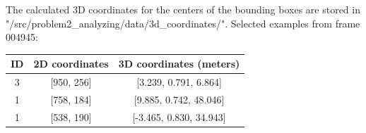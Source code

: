 \documentclass[]{article}
\begin{document}
\begin{enumerate}
		The calculated 3D coordinates for the centers of the bounding boxes are stored in "/src/problem2\_analyzing/data/3d\_coordinates/". Selected examples from frame 004945:
		
		\begin{center}
			\begin{tabular}{|c|c|c|}
				\hline
				\textbf{ID} & \textbf{2D coordinates} & \textbf{3D coordinates (meters)} \\
				\hline
				3 & [950, 256] & [3.239, 0.791, 6.864] \\
				1 & [758, 184] & [9.885, 0.742, 48.046] \\
				1 & [538, 190] & [-3.465, 0.830, 34.943] \\
				\hline
			\end{tabular}
		\end{center}
\end{enumerate}

\newpage
\end{document}

